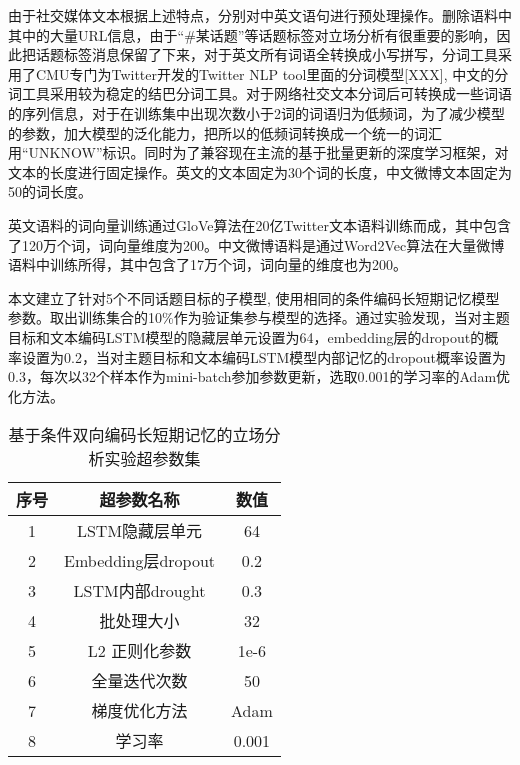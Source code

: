 由于社交媒体文本根据上述特点，分别对中英文语句进行预处理操作。删除语料中其中的大量URL信息，由于“\#某话题”等话题标签对立场分析有很重要的影响，因此把话题标签消息保留了下来，对于英文所有词语全转换成小写拼写，分词工具采用了CMU专门为Twitter开发的Twitter NLP tool里面的分词模型[XXX], 中文的分词工具采用较为稳定的结巴分词工具。对于网络社交文本分词后可转换成一些词语的序列信息，对于在训练集中出现次数小于2词的词语归为低频词，为了减少模型的参数，加大模型的泛化能力，把所以的低频词转换成一个统一的词汇用“UNKNOW”标识。同时为了兼容现在主流的基于批量更新的深度学习框架，对文本的长度进行固定操作。英文的文本固定为30个词的长度，中文微博文本固定为50的词长度。

英文语料的词向量训练通过GloVe算法在20亿Twitter文本语料训练而成，其中包含了120万个词，词向量维度为200。中文微博语料是通过Word2Vec算法在大量微博语料中训练所得，其中包含了17万个词，词向量的维度也为200。

本文建立了针对5个不同话题目标的子模型, 使用相同的条件编码长短期记忆模型参数。取出训练集合的10\%作为验证集参与模型的选择。通过实验发现，当对主题目标和文本编码LSTM模型的隐藏层单元设置为64，embedding层的dropout的概率设置为0.2，当对主题目标和文本编码LSTM模型内部记忆的dropout概率设置为0.3，每次以32个样本作为mini-batch参加参数更新，选取0.001的学习率的Adam优化方法。

\begin{table}[htbp]
	\caption[param]{基于条件双向编码长短期记忆的立场分析实验超参数集}
	\label{param}
	\vspace{0.5em}\centering\wuhao
	\begin{tabular}{ccc}
		\toprule[1.5pt]
		序号& 超参数名称 &数值\\
		\midrule[1pt]
		1 &LSTM隐藏层单元& 64\\
		2 &Embedding层dropout& 0.2\\
		3 &LSTM内部drought& 0.3\\
		4 &批处理大小& 32\\
		5 &L2 正则化参数 &1e-6\\
		6 &全量迭代次数& 50\\
		7 &梯度优化方法& Adam\\
		8 &学习率& 0.001\\
		\bottomrule[1.5pt]
	\end{tabular}
\end{table}

